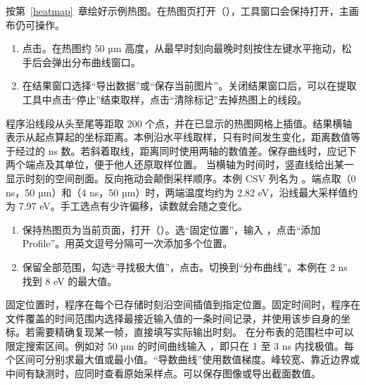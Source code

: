 
按第~\ref{heatmap}~章绘好示例热图。在热图页打开（），工具窗口会保持打开，主画布仍可操作。
\begin{enumerate}
\item 点击。在热图约 50 µm 高度，从最早时刻向最晚时刻按住左键水平拖动，松手后会弹出分布曲线窗口。
\item 在结果窗口选择“导出数据”或“保存当前图片”。关闭结果窗口后，可以在提取工具中点击“停止”结束取样，点击“清除标记”去掉热图上的线段。
\end{enumerate}
程序沿线段从头至尾等距取 200 个点，并在已显示的热图网格上插值。结果横轴  表示从起点算起的坐标距离。本例沿水平线取样，只有时间发生变化，距离数值等于经过的 ns 数。若斜着取线，距离同时使用两轴的数值差。保存曲线时，应记下两个端点及其单位，便于他人还原取样位置。
当横轴为时间时，竖直线给出某一显示时刻的空间剖面。反向拖动会颠倒采样顺序。本例 CSV 列名为 。端点取（0 ns，50 µm）和（4 ns，50 µm）时，两端温度均约为 2.82 eV，沿线最大采样值约为 7.97 eV。手工选点有少许偏移，读数就会随之变化。

\begin{enumerate}
\item 保持热图页为当前页面，打开（）。选“固定位置”，输入 ，点击“添加Profile”。用英文逗号分隔可一次添加多个位置。
\item 保留全部范围，勾选“寻找极大值”，点击。切换到“分布曲线”。本例在 2 ns 找到 8 eV 的最大值。
\end{enumerate}
固定位置时，程序在每个已存储时刻沿空间插值到指定位置。固定时间时，程序在文件覆盖的时间范围内选择最接近输入值的一条时间记录，并使用该步自身的坐标。若需要精确复现某一帧，直接填写实际输出时刻。
在分布表的范围栏中可以限定搜索区间。例如对 50 µm 的时间曲线输入 ，即只在 1 至 3 ns 内找极值。每个区间可分别求最大值或最小值。“导数曲线”使用数值梯度。峰较宽、靠近边界或中间有缺测时，应同时查看原始采样点。可以保存图像或导出截面数值。

